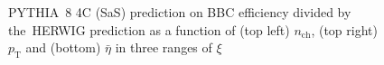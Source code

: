 \begin{figure}[h!]
\begin{subfigure}{.45\textwidth}
	\end{subfigure}
	\begin{minipage}{.45\textwidth}
		\caption{PYTHIA~8 4C (SaS) prediction on BBC efficiency  divided by the~HERWIG prediction as a function of (top left) $n_\textrm{ch}$, (top right) $p_\textrm{T}$ and (bottom)  $\bar{\eta}$ in three ranges of $\xi$}
		\label{fig:bbcCorection_syst}
	\end{minipage}
	
\end{figure}

\FloatBarrier